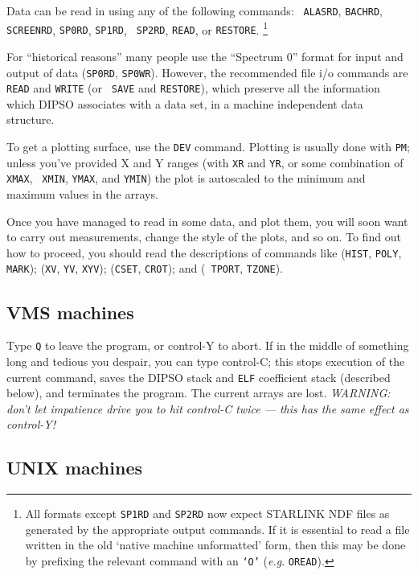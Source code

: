 Data can be read in using any of the following commands:  {\tt
ALASRD}, {\tt BACHRD}, {\tt SCREENRD}, {\tt SP0RD}, {\tt SP1RD}, {\tt
SP2RD}, {\tt READ}, or {\tt RESTORE}. \footnote{All formats except
{\tt SP1RD} and {\tt SP2RD} now expect STARLINK NDF files as generated
by the appropriate output commands. If it is essential to  read a file
written in the old `native machine unformatted' form, then this may be
done by prefixing the relevant command with an {\tt `O'} ({\em e.g}.
{\tt OREAD}).}

For ``historical reasons'' many people use the ``Spectrum 0'' format
for input and output of data ({\tt SP0RD}, {\tt SP0WR}). However, the
recommended file i/o commands are {\tt READ} and {\tt WRITE} (or {\tt
SAVE} and {\tt RESTORE}), which preserve all the information which
DIPSO associates with a data set, in a machine independent data
structure.

To get a plotting surface, use the {\tt DEV} command. Plotting is
usually done with {\tt PM};  unless you've provided X and Y ranges
(with {\tt XR} and {\tt YR}, or some combination of {\tt XMAX}, {\tt
XMIN}, {\tt YMAX}, and {\tt YMIN}) the plot is autoscaled to the
minimum and maximum values in the arrays.

Once you have managed to read in some data, and plot them, you will
soon want to carry out measurements, change the style of the plots,
and so on. To find out how to proceed, you should read the
descriptions of commands like ({\tt HIST}, {\tt POLY}, {\tt MARK}); 
({\tt XV}, {\tt YV}, {\tt XYV});  ({\tt CSET}, {\tt CROT});  and ({\tt
TPORT}, {\tt TZONE}).

\subsection{VMS machines}

Type {\tt Q} to leave the program, or control-Y to abort. If in the
middle of something long and tedious you despair, you can type
control-C; this stops execution of the current command, saves the
DIPSO stack and {\tt ELF} coefficient stack (described below), and
terminates the program. The current arrays are lost. {\em WARNING:
don't let impatience drive you to hit control-C twice --- this has the
same effect as control-Y!}

\subsection{UNIX machines}

